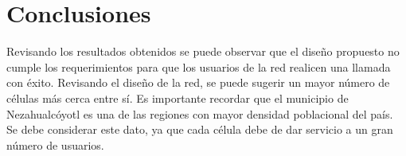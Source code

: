 \documentclass[11pt,letterpaper]{article}
\begin{document}
\section{Conclusiones}
Revisando los resultados obtenidos se puede observar que el diseño propuesto no 
cumple los requerimientos para que los usuarios de la red realicen una llamada con 
éxito. Revisando el diseño de la red, se puede sugerir un mayor número de células 
más cerca entre sí. Es importante recordar que el municipio de Nezahualcóyotl es 
una de las regiones con mayor densidad poblacional del país. Se debe considerar 
este dato, ya que cada célula debe de dar servicio a un gran número de usuarios.

\end{document}
